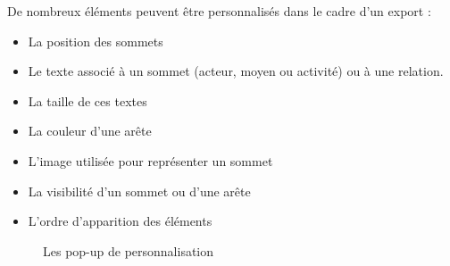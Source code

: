 De nombreux éléments peuvent être personnalisés dans le cadre d'un export :\\
\begin{itemize}
\item La position des sommets
\item Le texte associé à un sommet (acteur, moyen ou activité) ou à une relation.
\item La taille de ces textes
\item La couleur d'une arête
\item L'image utilisée pour représenter un sommet
\item La visibilité d'un sommet ou d'une arête
\item L'ordre d'apparition des éléments\\
\end{itemize}
\begin{figure}[h!]
\centering
{}
\hspace*{35pt}

\caption{Les pop-up de personnalisation}
\label{popup}
\end{figure}


